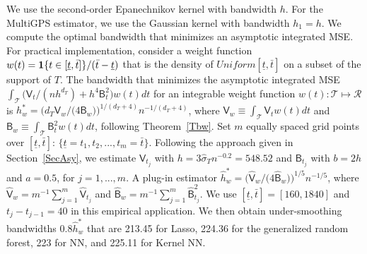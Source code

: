 \documentclass[lettersize, 12pt]{article}
\begin{document}
We use the second-order Epanechnikov kernel with bandwidth $h$. 
For the MultiGPS estimator, we use the Gaussian kernel with bandwidth $h_1=h$.
We compute the optimal bandwidth that minimizes an asymptotic integrated MSE.
For practical implementation, consider a weight function $w(t) = {\bf 1}\{ t \in [\underline{t}, \bar t]\}/(\bar t - \underline{t})$ that is the density of $Uniform[\underline{t}, \bar t]$ on a subset of the support of $T$.
The bandwidth that minimizes the asymptotic integrated MSE $
\int_{\mathcal{T}} \big( \mathsf{V}_t/(nh^{d_T}) + h^4 \mathsf{B}_t^2\big) w(t) dt$
for an integrable weight function $w(t): \mathcal{T} \mapsto \mathcal{R}$
is $h^\ast_w =  \big(d_T\mathsf{V}_w\big/\big(4\mathsf{B}_w\big)\big)^{1/(d_T+4)} n^{-1/(d_T+4)}$,
where $\mathsf{V}_w \equiv \int_{\mathcal{T}} \mathsf{V}_t w(t) dt$ and 
$\mathsf{B}_w \equiv \int_{\mathcal{T}}   \mathsf{B}_t^2 w(t) dt$,  following Theorem~\ref{Tbw}.
Set $m$ equally spaced grid points over $[\underline{t}, \bar t]$: $\big\{\underline{t} = t_1, t_2,..., t_m = \bar t\big\}$.
Following the approach given in Section~\ref{SecAsy}, we estimate ${\mathsf{V}}_{t_j}$ with $h=3\hat\sigma_Tn^{-0.2} = 548.52$
and ${\mathsf{B}}_{t_j}$ with $b = 2h$ and $a=0.5$, for $j=1,...,m$.
A plug-in estimator $\hat h^\ast_w =  \big(\hat{\mathsf{V}}_w\big/\big(4\hat{\mathsf{B}}_w\big)\big)^{1/5} n^{-1/5}$, where
 $\hat{\mathsf{V}}_w = m^{-1}\sum_{j=1}^m \hat{\mathsf{V}}_{t_j}$
 and 
 $\hat{\mathsf{B}}_w = m^{-1}\sum_{j=1}^m \hat{\mathsf{B}}_{t_j}^2$.
We use $[\underline{t}, \bar t] = [160, 1840]$ and $t_j - t_{j-1} = 40$ in this empirical application.
We then obtain under-smoothing bandwidths  $0.8 \hat h^\ast_w$  that are 213.45 for Lasso,  224.36 for the generalized random forest, 223 for NN, and 225.11 for Kernel NN.
\end{document}
